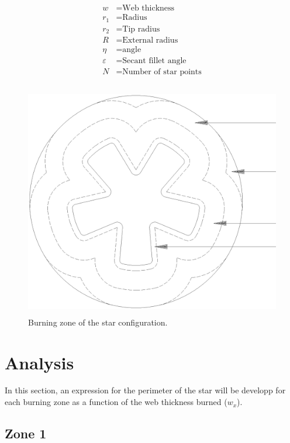 \documentclass[11pt, titlepage]{article}
\begin{document}
\begin{align*}
   w &= \text{Web thickness}\\
 r_1 &= \text{Radius}\\
 r_2 &= \text{Tip radius}\\
   R &= \text{External radius}\\
\eta &= \text{angle}\\
\varepsilon &= \text{Secant fillet angle}\\
   N &= \text{Number of star points}\\
\end{align*}


\begin{figure}
 \begin{center}
 \includegraphics[height=4in]{img/mainstar.ps}
      \caption{Burning zone of the star configuration.}\label{star}
 \end{center}
\end{figure}

\section{Analysis}

In this section, an expression for the perimeter of the star will be
developp for each burning zone as a function of the web thickness
burned ($w_x$).

  \subsection{Zone 1}
  
\end{document}
